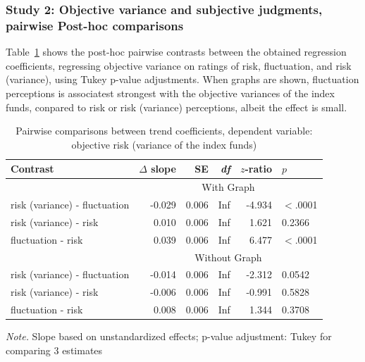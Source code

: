 \subsubsection{Study 2: Objective variance and subjective judgments, pairwise Post-hoc comparisons}
Table~\ref{tab:study2_hlm_trends_pairwise} shows the post-hoc pairwise contrasts between the obtained regression coefficients, regressing objective variance on ratings of risk, fluctuation, and risk (variance), using Tukey p-value adjustments. When graphs are shown, fluctuation perceptions is associatest strongest with the objective variances of the index funds, conpared to risk or risk (variance) perceptions, albeit the effect is small.
\begin{table}[H]
\centering
\caption{Pairwise comparisons between trend coefficients, dependent variable: objective risk (variance of the index funds)} 
\label{tab:study2_hlm_trends_pairwise}
\begin{threeparttable}

    
    \begin{tabular}{lrrrrl}
      \toprule
    Contrast & $\Delta$ slope & SE & \textit{df} & $z$-ratio & $p$ \\ 
      \midrule
      & \multicolumn{5}{c}{With Graph}\\
      \cmidrule{2-6}
    risk (variance) - fluctuation & -0.029 & 0.006 & Inf & -4.934 & $<$.0001 \\ 
      risk (variance) - risk & 0.010 & 0.006 & Inf & 1.621 & 0.2366 \\ 
      fluctuation - risk & 0.039 & 0.006 & Inf & 6.477 & $<$.0001 \\ 
       \midrule
       & \multicolumn{5}{c}{Without Graph}\\
       \cmidrule{2-6}
    risk (variance) - fluctuation & -0.014 & 0.006 & Inf & -2.312 & 0.0542 \\ 
      risk (variance) - risk & -0.006 & 0.006 & Inf & -0.991 & 0.5828 \\ 
      fluctuation - risk & 0.008 & 0.006 & Inf & 1.344 & 0.3708 \\ 
       \bottomrule
    \end{tabular}
    \begin{tablenotes}
    \textit{Note.} Slope based on unstandardized effects; p-value adjustment: Tukey for comparing 3 estimates
    \end{tablenotes}
    \end{threeparttable}
\end{table}



